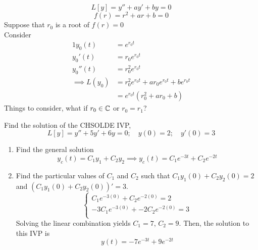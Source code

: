 \documentclass[twoside]{report}
\begin{document}
    \begin{example}
        \begin{equation}
            L[y] = y'' + ay' + by = 0
        \end{equation}
        \begin{equation}
            f(r) = r^{2} + ar + b = 0
        \end{equation}
        Suppose that $r_{0}$ is a root of $f(r) = 0$\\
        Consider \begin{alignat}{1}
            y_{0}(t) &= e^{r_{0}t}\\
            y_{0}'(t) &= r_{0}e^{r_{0}t}\\
            y_{0}''(t) &= r_{0}^{2}e^{r_{0}t}\\
            \implies L(y_{0}) &= r_{0}^{2}e^{r_{0}t} + ar_{0}e^{r_{0}t} + be^{r_{0}t}\\
            &=e^{r_{0}t}(r_{0}^{2} + ar_{0} + b)
        \end{alignat}
        Things to consider, what if $r_{0} \in \mathbb{C}$ or $r_{0} = r_{1}$?
    \end{example}
    \begin{example}
        Find the solution of the CHSOLDE IVP,
        \begin{equation}
            L[y] = y'' + 5y' + 6y = 0;\quad y(0) = 2;\quad y'(0) = 3
        \end{equation}
        \begin{enumerate}
            \item Find the general solution
            \begin{equation}
                y_{c}(t) = C_{1}y_{1} + C_{2}y_{2} \implies y_{c}(t) = C_{1}e^{-3t} + C_{2}e^{-2t}
            \end{equation}
            \item Find the particular values of $C_1$ and $C_2$ such that $C_{1}y_{1}(0) + C_{2}y_{2}(0) = 2$ and $(C_{1}y_{1}(0) + C_{2}y_{2}(0))' = 3$.
            \begin{equation}
                \begin{cases}
                    C_{1}e^{-3(0)} + C_{2}e^{-2(0)} = 2\\
                    -3C_{1}e^{-3(0)} + -2C_{2}e^{-2(0)} = 3\\
                \end{cases}
            \end{equation}
            Solving the linear combination yields $C_{1} = 7$, $C_{2} = 9$.
            Then, the solution to this IVP is
            \begin{equation}
                y(t) = -7e^{-3t} + 9 e^{-2t}
            \end{equation}
        \end{enumerate}
    \end{example}
\end{document}

